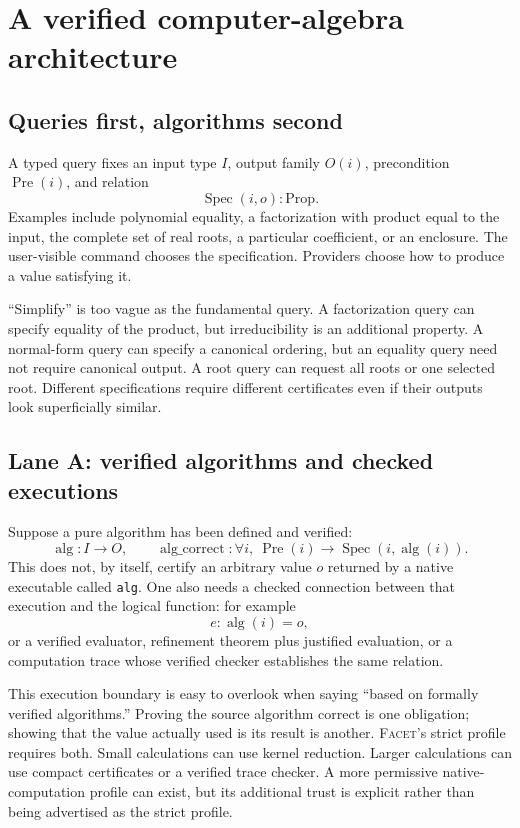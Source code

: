 \documentclass[11pt,a4paper]{article}
\newcommand{\code}[1]{\nolinkurl{#1}}
\newcommand{\Facet}{\textsc{Facet}}
\newcommand{\Spec}{\operatorname{Spec}}
\theoremstyle{definition}
\begin{document}
\section{A verified computer-algebra architecture}\label{sec:cas}
\subsection{Queries first, algorithms second}
A typed query fixes an input type \(I\), output family \(O(i)\), precondition
\(\operatorname{Pre}(i)\), and relation
\[
 \Spec(i,o):\mathrm{Prop}.
\]
Examples include polynomial equality, a factorization with product equal to the
input, the complete set of real roots, a particular coefficient, or an enclosure.
The user-visible command chooses the specification. Providers choose how to
produce a value satisfying it.

``Simplify'' is too vague as the fundamental query. A factorization query can
specify equality of the product, but irreducibility is an additional property.
A normal-form query can specify a canonical ordering, but an equality query need
not require canonical output. A root query can request all roots or one selected
root. Different specifications require different certificates even if their
outputs look superficially similar.

\subsection{Lane A: verified algorithms and checked executions}
Suppose a pure algorithm has been defined and verified:
\[
 \operatorname{alg}:I\to O,
 \qquad
 \operatorname{alg\_correct}:\forall i,\ \operatorname{Pre}(i)
       \to\Spec(i,\operatorname{alg}(i)).
\]
This does not, by itself, certify an arbitrary value \(o\) returned by a native
executable called \code{alg}. One also needs a checked connection between that
execution and the logical function: for example
\[
 e:\operatorname{alg}(i)=o,
\]
or a verified evaluator, refinement theorem plus justified evaluation, or a
computation trace whose verified checker establishes the same relation.

This execution boundary is easy to overlook when saying ``based on formally
verified algorithms.'' Proving the source algorithm correct is one obligation;
showing that the value actually used is its result is another. \Facet's strict
profile requires both. Small calculations can use kernel reduction. Larger
calculations can use compact certificates or a verified trace checker. A more
permissive native-computation profile can exist, but its additional trust is
explicit rather than being advertised as the strict profile.
\end{document}
